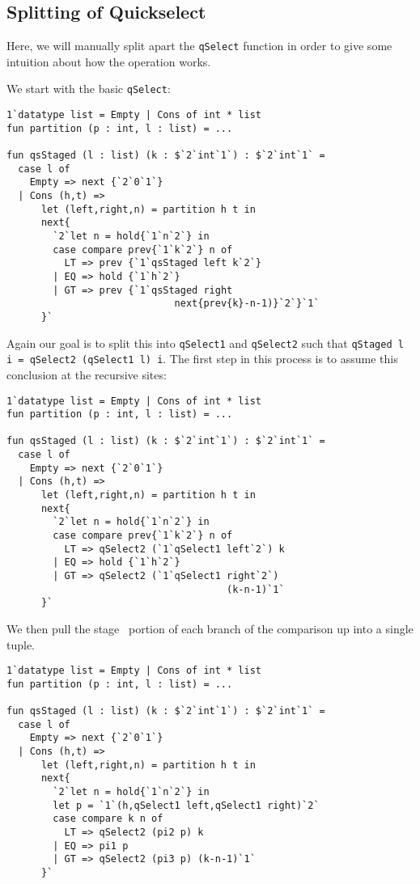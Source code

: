 \subsection{Splitting of Quickselect}

Here, we will manually split apart the \texttt{qSelect} function in order to give some intuition about how the operation works.

We start with the basic \texttt{qSelect}:

\begin{lstlisting} 
1`datatype list = Empty | Cons of int * list
fun partition (p : int, l : list) = ...

fun qsStaged (l : list) (k : $`2`int`1`) : $`2`int`1` = 
  case l of
    Empty => next {`2`0`1`}
  | Cons (h,t) => 
      let (left,right,n) = partition h t in
      next{
        `2`let n = hold{`1`n`2`} in
        case compare prev{`1`k`2`} n of
          LT => prev {`1`qsStaged left k`2`}
        | EQ => hold {`1`h`2`}
        | GT => prev {`1`qsStaged right 
                             next{prev{k}-n-1)}`2`}`1`
      }`
\end{lstlisting}

Again our goal is to split this into \texttt{qSelect1} and \texttt{qSelect2} such that \texttt{qStaged l i = qSelect2 (qSelect1 l) i}.  
The first step in this process is to assume this conclusion at the recursive sites:

\begin{lstlisting} 
1`datatype list = Empty | Cons of int * list
fun partition (p : int, l : list) = ...

fun qsStaged (l : list) (k : $`2`int`1`) : $`2`int`1` = 
  case l of
    Empty => next {`2`0`1`}
  | Cons (h,t) => 
      let (left,right,n) = partition h t in
      next{
        `2`let n = hold{`1`n`2`} in
        case compare prev{`1`k`2`} n of
          LT => qSelect2 (`1`qSelect1 left`2`) k
        | EQ => hold {`1`h`2`}
        | GT => qSelect2 (`1`qSelect1 right`2`) 
                                      (k-n-1)`1`
      }`
\end{lstlisting}

We then pull the stage \bbone\ portion of each branch of the comparison up into a single tuple.

\begin{lstlisting} 
1`datatype list = Empty | Cons of int * list
fun partition (p : int, l : list) = ...

fun qsStaged (l : list) (k : $`2`int`1`) : $`2`int`1` = 
  case l of
    Empty => next {`2`0`1`}
  | Cons (h,t) => 
      let (left,right,n) = partition h t in
      next{
        `2`let n = hold{`1`n`2`} in
        let p = `1`(h,qSelect1 left,qSelect1 right)`2`
        case compare k n of
          LT => qSelect2 (pi2 p) k
        | EQ => pi1 p
        | GT => qSelect2 (pi3 p) (k-n-1)`1`
      }`
\end{lstlisting}

